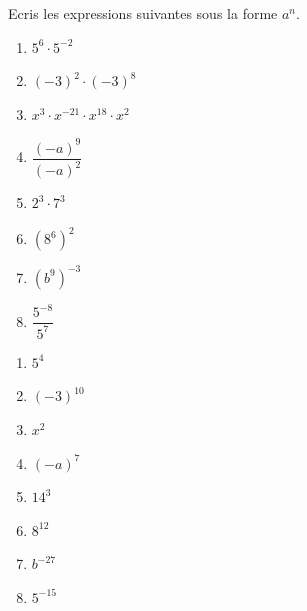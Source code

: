 \begin{exercise}
  Ecris les expressions suivantes sous la forme $a^{n}$.
  \begin{enumerate}[cols=2]
    \item $5^{6} \cdot 5^{- 2}$
    \item $( - 3)^{2} \cdot ( - 3)^{8}$
    \item $x^{3} \cdot x^{- 21} \cdot x^{18} \cdot x^{2}$
    \item $\dfrac{( - a)^{9}}{( - a)^{2}}$
    \item $2^{3} \cdot 7^{3}$
    \item $\left(8^{6}\right)^2$
    \item $\left( b^{9} \right)^{- 3}$
    \item $\dfrac{5^{- 8}}{5^{7}}$
  \end{enumerate}
\end{exercise}

\begin{solution}
  \begin{enumerate}[cols=4]
    \item $5^{4}$
    \item $(-3)^{10}$
    \item $x^2$
    \item $(-a)^7$
    \item $14^3$
    \item $8^{12}$
    \item $b^{-27}$
    \item $5^{-15}$
  \end{enumerate}
\end{solution}

